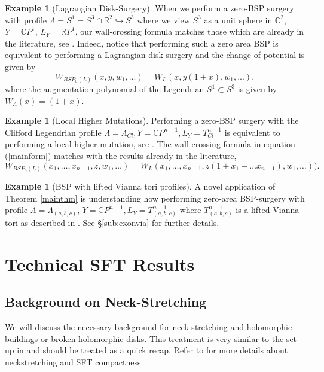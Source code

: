 \documentclass[11pt, oneside,dvipsnames]{amsart}
\newcommand{\sub}{\subset}
\newcommand{\<}{\langle}
\renewcommand{\>}{\rangle}
\newcommand{\bC}{\mathbb{C}}
\newcommand{\bR}{\mathbb{R}}
\newcommand{\abc}{{(a,b,c)}}
\theoremstyle{definition}
\theoremstyle{definition}
\newtheorem{example}[Theorem]{Example}
\numberwithin{equation}{subsection}
\begin{document}
\begin{example}[Lagrangian Disk-Surgery]\label{ex:disksurg}
    When we perform a zero-BSP surgery with profile $\Lambda = S^1 = S^3 \cap \bR^2 \hookrightarrow S^3$ where we view $S^3$ as a unit sphere in $\bC^2$, $Y= \bC P^1$, $L_Y = \bR P^1$, our wall-crossing formula matches those which are already in the literature, see \cite{Aur07,PW19,ch10}. Indeed, notice that performing such a zero area BSP is equivalent to performing a Lagrangian disk-surgery and the change of potential is given by $$W_{BSP_0(L)}(x,y,w_1,...) = W_L (x,y(1+x),w_1,...),$$ where the augmentation polynomial of the Legendrian $S^1 \sub S^3$ is given by  $ W_{\Lambda} (x) = (1+x)$.
\end{example}
\begin{example}[Local Higher Mutations] \label{ex:highermut}
Performing a zero-BSP surgery with the Clifford Legendrian profile $\Lambda = \Lambda_{Cl}, Y=\bC P^{n-1}, L_Y = T^{n-1}_{Cl}$ is equivalent to performing a local higher mutation, see \cite{PT20,Cha23}. The wall-crossing formula in equation (\ref{mainform}) matches with the results already in the literature,
    $$W_{BSP_0(L)}(x_1,\dots,x_{n-1}, z, w_1,\dots) = W_L(x_1,\dots,x_{n-1},z(1+x_1 + \dots x_{n-1}), w_1,\dots)).$$
\end{example}
\begin{example}[BSP with lifted Vianna tori profiles]
A novel application of Theorem \ref{mainthm} is understanding how performing zero-area BSP-surgery with profile $\Lambda=\Lambda_{\abc}$,  $Y=\bC P^{n-1}, L_Y = T^{n-1}_{\abc}$ where $T^{n-1}_\abc $ is a lifted Vianna tori as described in \cite{chw}. See \S \ref{sub:exonvia} for further details.
    
\end{example}



\section{Technical SFT Results}\label{appendix}

\subsection{Background on Neck-Stretching} \label{sftbackground}

We will discuss the necessary background for neck-stretching and holomorphic buildings or broken holomorphic disks. This treatment is very similar to the set up in \cite{floflip,Cha23} and should be treated as  a quick recap. Refer to \cite{BEH03,floflip,CM05,Abbasbook} for more details about neckstretching and SFT compactness.  
\end{document}
